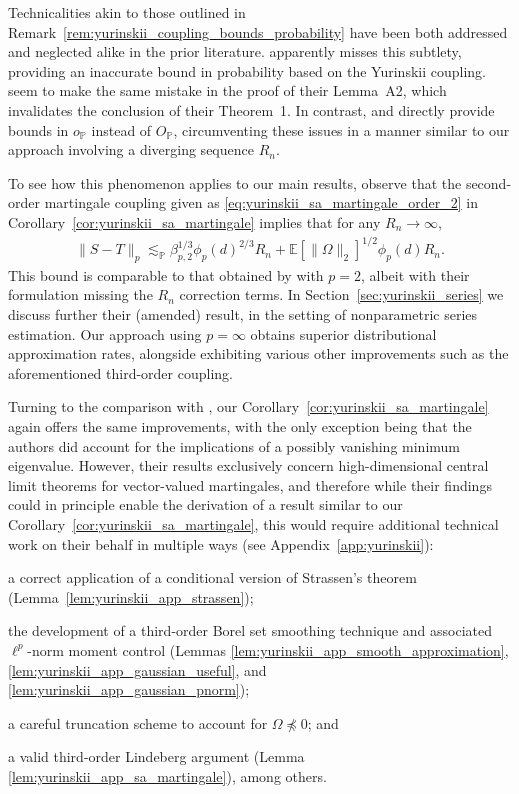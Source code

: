 \documentclass[11pt,lof]{puthesis}
\renewcommand{\P}{\ensuremath{\mathbb{P}}}
\newcommand{\E}{\ensuremath{\mathbb{E}}}
\theoremstyle{break}
\theoremstyle{proof}
\begin{document}
Technicalities akin to those outlined in
Remark~\ref{rem:yurinskii_coupling_bounds_probability} have been both addressed
and
neglected alike in the prior literature. \citet[Chapter 10.4, Example
16]{pollard2002user} apparently misses this subtlety, providing an
inaccurate bound in probability based on the Yurinskii coupling.
\citet{li2020uniform} seem to make the same mistake in the proof of their
Lemma~A2, which invalidates the conclusion of their Theorem~1. In contrast,
\citet{belloni2015some} and \citet{belloni2019conditional} directly provide
bounds in $o_\P$ instead of $O_\P$, circumventing these issues in a manner
similar to our approach involving a diverging sequence $R_n$.

To see how this phenomenon applies to our main results, observe that the
second-order martingale coupling given as
\eqref{eq:yurinskii_sa_martingale_order_2} in
Corollary~\ref{cor:yurinskii_sa_martingale} implies that for any
$R_n \to \infty$,
%
\begin{align*}
\|S - T\|_p
\lesssim_\P
\beta_{p,2}^{1/3}
\phi_p(d)^{2/3} R_n
+ \E[\|\Omega\|_2]^{1/2}
\phi_p(d) R_n.
\end{align*}
%
This bound is comparable to that obtained by \citet[Theorem~1]{li2020uniform}
with $p=2$, albeit with their formulation missing the $R_n$ correction terms.
In Section~\ref{sec:yurinskii_series} we discuss further their (amended)
result, in the
setting of nonparametric series estimation. Our approach using
$p = \infty$ obtains superior distributional approximation rates, alongside
exhibiting various other improvements such as the aforementioned third-order
coupling.

Turning to the comparison with \citet{belloni2018high}, our
Corollary~\ref{cor:yurinskii_sa_martingale} again offers the same improvements,
with the
only exception being that the authors did account for the implications of a
possibly vanishing minimum eigenvalue. However, their results exclusively
concern high-dimensional central limit theorems for vector-valued martingales,
and therefore while their findings
could in principle enable the derivation of a result similar to our
Corollary~\ref{cor:yurinskii_sa_martingale}, this would require additional
technical work
on their behalf in multiple ways
(see Appendix~\ref{app:yurinskii}):
%
\begin{inlineroman}
\item a correct application of a conditional
version of Strassen's theorem
(Lemma~\ref{lem:yurinskii_app_strassen});
\item the development of a third-order Borel set smoothing technique and
associated $\ell^p$-norm moment control
(Lemmas \ref{lem:yurinskii_app_smooth_approximation},
\ref{lem:yurinskii_app_gaussian_useful},
and \ref{lem:yurinskii_app_gaussian_pnorm});
\item a careful truncation scheme to account for
$\Omega\npreceq0$; and
\item a valid third-order Lindeberg argument
(Lemma \ref{lem:yurinskii_app_sa_martingale}),
among others.
\end{inlineroman}
\end{document}
